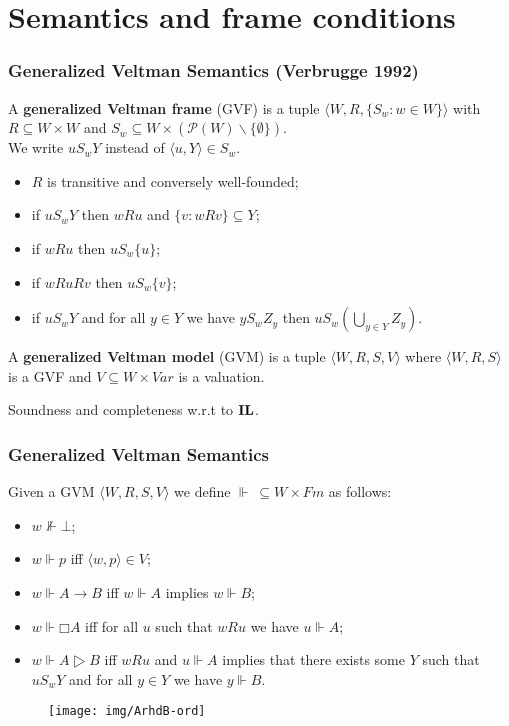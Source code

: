 \documentclass[xcolor={x11names}]{beamer}
\newcommand{\prin}[1]{\ensuremath{\textbf{\textup{#1}}}\xspace}
\newcommand{\il}{\prin{IL}}
\begin{document}
\section{Semantics and frame conditions}
\begin{frame}
  \frametitle{Generalized Veltman Semantics (Verbrugge 1992)}
  A \textbf{generalized Veltman frame} (GVF) is a tuple $⟨W,R,\{S_w:w∈W\}⟩$ with
  $R⊆W×W$ and $S_w⊆W×(𝒫(W)∖\{∅\})$.\\ We write $uS_wY$ instead of $⟨u,Y⟩∈S_w$.
  \begin{itemize}
    \item $R$ is transitive and conversely well-founded;
    \item if $uS_wY$ then $wRu$ and $\{v:wRv\}⊆Y$;
    \item if $wRu$ then $uS_w\{u\}$;
    \item if $wRuRv$ then $uS_w\{v\}$;
    \item if $uS_wY$ and for all $y∈Y$ we have $yS_wZ_y$ then $uS_w\left(⋃_{y∈Y}Z_y\right)$.
  \end{itemize}

  \pause
  \vspace{0.3cm}
  A \textbf{generalized Veltman model} (GVM) is a tuple $⟨W,R,S,V⟩$ where
  $⟨W,R,S⟩$ is a GVF and $V⊆W×Var$ is a valuation.

  \vspace{0.2cm}
  Soundness and completeness w.r.t to \il.
\end{frame}

\begin{frame}
  \frametitle{Generalized Veltman Semantics}
  Given a GVM $⟨W,R,S,V⟩$ we define $⊩\ ⊆W×Fm$ as follows:
  \begin{itemize}
    \item $w⊮⊥$;
    \item $w⊩p$ iff $⟨w,p⟩∈V$;
    \item $w⊩A→B$ iff $w⊩A$ implies $w⊩B$;
    \item $w⊩□A$ iff for all $u$ such that $wRu$ we have $u⊩A$;
      \pause
    \item $w⊩A▷B$ iff $wRu$ and $u⊩A$ implies that there exists some $Y$ such
      that $uS_wY$ and for all $y∈Y$ we have $y⊩B$.
  \end{itemize}
  \begin{figure}[t]
    \texttt{[image: img/ArhdB-ord]}
    \centering
  \end{figure}
\end{frame}
\end{document}
